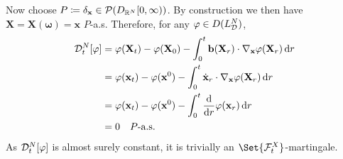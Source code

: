 Now choose $P \coloneqq \delta_{\mathbf{x}} \in \mathcal{P}(D_{\mathbb{R}^N}[0,\infty))$.
By construction we then have $\bm{X} = \bm{X}(\bm{\omega}) = \bm{x}$ $P$-a.s.
Therefore, for any $\varphi \in D(L_{\mathcal{D}}^N)$,
\begin{equation}
\begin{split}
    \cD_t^{N}[\varphi] &= \varphi(\bm{X}_t) - \varphi(\bm{X}_0) - \int_0^t \bm{b}(\bm{X}_r) \cdot \nabla_{\bm{x}} \varphi(\bm{X}_r) \odif{r} \\
    &= \varphi(\bm{x}_t) - \varphi(\bm{x}^0) - \int_0^t \dot{\bm{x}}_r \cdot \nabla_{\bm{x}} \varphi(\bm{X}_r) \odif{r} \\
    &= \varphi(\bm{x}_t) - \varphi(\bm{x}^0) - \int_0^t \odv{}{r} \varphi(\bm{x}_r) \odif{r} \\
    &= 0 \quad P\text{-a.s.}
\end{split}
\end{equation}
As $\mathcal{D}_t^{N}[\varphi]$ is almost surely constant, it is trivially an $\Set{\cF_t^X}$-martingale.


